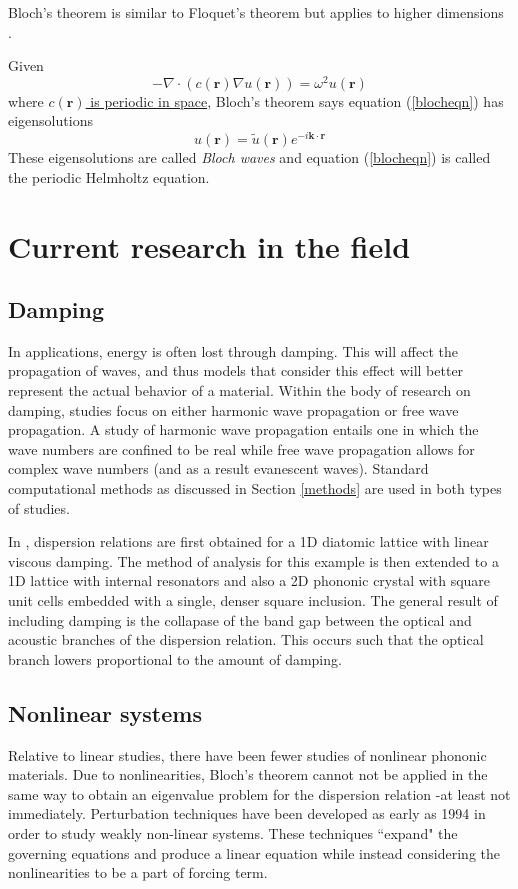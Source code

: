 \documentclass{article}
\begin{document}
Bloch's theorem is similar to Floquet's theorem but applies to higher 
dimensions \cite{laude15}. 

Given
\begin{equation} \label{blocheqn}
-\nabla \cdot \left( c(\mathbf{r}) \nabla u(\mathbf{r}) \right) = \omega^2 
u(\mathbf{r})
\end{equation}
where \underline{$c(\mathbf{r})$ is periodic in space}, Bloch's theorem says 
equation (\ref{blocheqn}) has eigensolutions
\begin{equation}
u(\mathbf{r}) = \tilde{u}(\mathbf{r}) e^{-i\mathbf{k} \cdot \mathbf{r}} 
\end{equation}
These eigensolutions are called \emph{Bloch waves} and equation 
(\ref{blocheqn}) is called the periodic Helmholtz equation.

\section{Current research in the field}
\subsection{Damping}
In applications, energy is often lost through damping. This will affect the 
propagation of waves, and thus models that consider this effect will better 
represent the actual behavior of a material. Within the body of research on 
damping, studies focus on either harmonic wave propagation or free wave 
propagation. A study of harmonic wave propagation entails one in which the wave 
numbers are confined to be real while free wave propagation allows for complex 
wave numbers (and as a result evanescent waves). Standard computational methods 
as discussed in Section \ref{methods} are used in both types of studies. 

In \cite{hussein14}, dispersion relations are first obtained for a 1D diatomic 
lattice with linear viscous damping. The method of analysis for this example is 
then extended to a 1D lattice with internal resonators and also a 2D phononic 
crystal with square unit cells embedded with a single, denser square inclusion. 
The general result of including damping is the collapase of the band gap 
between the optical and acoustic branches of the dispersion relation. This 
occurs such that the optical branch lowers proportional to the amount of 
damping.

\subsection{Nonlinear systems}
Relative to linear studies, there have been fewer studies of nonlinear phononic 
materials. Due to nonlinearities, Bloch's theorem cannot not be applied in the 
same way to obtain an eigenvalue problem for the dispersion relation -at least 
not immediately. Perturbation techniques have been developed as early as 1994 
in order to study weakly non-linear systems. These techniques ``expand" the 
governing equations and produce a linear equation while instead considering the 
nonlinearities to be a part of forcing term.
\end{document}

